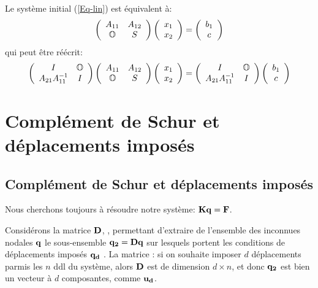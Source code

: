 \medskip
Le système initial (\ref{Eq-lin}) est équivalent à:
\begin{equation}\label{Eq-Sch1}
\left( \begin{array}{cc} A_{11} & A_{12}\\ \mathbb{O} & S \end{array}\right)
\left( \begin{array}{c} x_1\\ x_2 \end{array}\right) =
\left( \begin{array}{c} b_1\\ c \end{array}\right) 
\end{equation}
qui peut être réécrit:
\begin{equation}
\left( \begin{array}{cc} I & \mathbb{O}{} \\ A_{21}A_{11}^{-1} & I \end{array}\right)
\left( \begin{array}{cc} A_{11} & A_{12}\\ \mathbb{O}{} & S \end{array}\right)
\left( \begin{array}{c} x_1\\ x_2 \end{array}\right) =
\left( \begin{array}{cc} I & \mathbb{O}{} \\ A_{21}A_{11}^{-1} & I \end{array}\right)
\left( \begin{array}{c} b_1\\ c \end{array}\right)
\end{equation}



\medskip
\ifVersionAvecExemplesSepares
   \section{Complément de Schur et déplacements imposés}
\else
   \subsection{Complément de Schur et déplacements imposés}
\fi

Nous cherchons toujours à résoudre notre système: $\mathbf{K}\mathbf{q}=\mathbf{F}$.

\medskip
Considérons la matrice $\mathbf{D}$, , permettant d'extraire de l'ensemble des inconnues
nodales $\mathbf{q}$ le sous-ensemble $\mathbf{q_2}=\mathbf{D}\mathbf{q}$ sur lesquels portent les conditions de déplacements imposés $\mathbf{q_d}$
.
La matrice : si on souhaite imposer $d$ déplacements parmis les $n$ ddl
du système, alors $\mathbf{D}$ est de dimension $d\times n$, et donc $\mathbf{q_2}$ est bien un vecteur à $d$ composantes,
comme $\mathbf{u_d}$.

